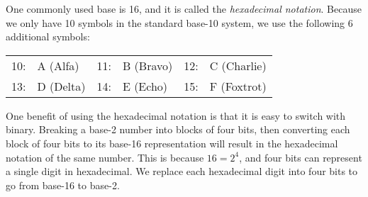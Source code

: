 \documentclass[12pt]{article}
\begin{document}
One commonly used base is 16, and it is called the \emph{hexadecimal notation}. Because we only have 10 symbols in the standard base-10 system, we use the following 6 additional symbols:
\begin{center}
\begin{tabular} {llllll}
10: &A (Alfa) &11: &B (Bravo) &12: &C (Charlie) \\ 
13: &D (Delta) &14: &E (Echo) &15: &F (Foxtrot)
\end{tabular}
\end{center}

One benefit of using the hexadecimal notation is that it is easy to switch with binary. Breaking a base-2 number into blocks of four bits, then converting each block of four bits to its base-16 representation will result in the hexadecimal notation of the same number. This is because $16=2^4$, and four bits can represent a single digit in hexadecimal. We replace each hexadecimal digit into four bits to go from base-16 to base-2. 
\end{document}
